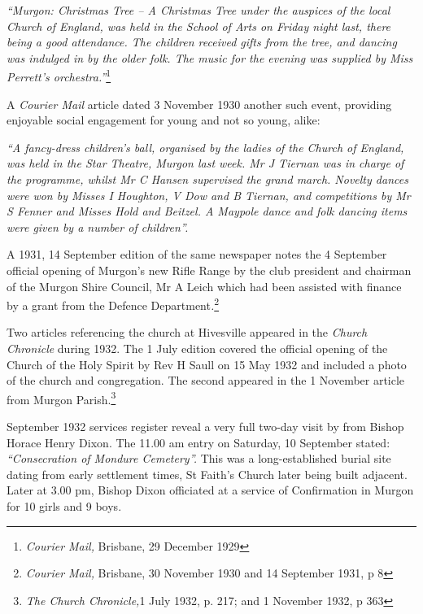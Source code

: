 \emph{``Murgon: Christmas Tree -- A Christmas Tree under the auspices of the local Church of England, was held in the School of Arts on Friday night last, there being a good attendance. The children received gifts from the tree, and dancing was indulged in by the older folk. The music for the evening was supplied by Miss Perrett's orchestra.''}\footnote{\emph{Courier Mail,} Brisbane, 29 December 1929}


A \emph{Courier Mail} article dated 3 November 1930 another such event, providing enjoyable social engagement for young and not so young, alike:



\emph{``A fancy-dress children's ball, organised by the ladies of the Church of England, was held in the Star Theatre, Murgon last week. Mr J Tiernan was in charge of the programme, whilst Mr C Hansen supervised the grand march. Novelty dances were won by Misses I Houghton, V Dow and B Tiernan, and competitions by Mr S Fenner and Misses Hold and Beitzel. A Maypole dance and folk dancing items were given by a number of children''.}



A 1931, 14 September edition of the same newspaper notes the 4 September official opening of Murgon's new Rifle Range by the club president and chairman of the Murgon Shire Council, Mr A Leich which had been assisted with finance by a grant from the Defence Department\emph{.}\footnote{\emph{Courier Mail,} Brisbane, 30 November 1930 and 14 September 1931, p 8}


Two articles referencing the church at Hivesville appeared in the \emph{Church Chronicle} during 1932. The 1 July edition covered the official opening of the Church of the Holy Spirit by Rev H Saull on 15 May 1932 and included a photo of the church and congregation. The second appeared in the 1 November article from Murgon Parish.\footnote{\emph{The Church Chronicle,}1 July 1932, p. 217; and 1 November 1932, p 363}


September 1932 services register reveal a very full two-day visit by from Bishop Horace Henry Dixon. The 11.00 am entry on Saturday, 10 September stated: \emph{``Consecration of Mondure Cemetery''.} This was a long-established burial site dating from early settlement times, St Faith's Church later being built adjacent. Later at 3.00 pm, Bishop Dixon officiated at a service of Confirmation in Murgon for 10 girls and 9 boys.




